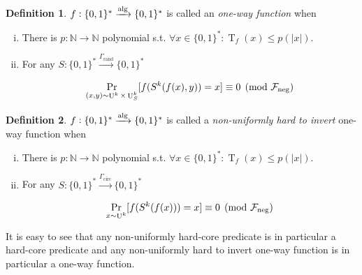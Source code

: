 \documentclass{article}
\numberwithin{equation}{section}
\theoremstyle{definition}
\newtheorem{definition}{Definition}[section]
\theoremstyle{plain}
\newcommand{\Bool}{\{0,1\}}
\newcommand{\Words}{{\Bool^*}}
\DeclareMathOperator{\Prb}{Pr}
\DeclareMathOperator{\T}{T}
\DeclareMathOperator{\Un}{U}
\newcommand{\Nats}{\mathbb{N}}
\newcommand{\Abs}[1]{\lvert #1 \rvert}
\newcommand{\Fall}{\mathcal{F}}
\newcommand{\Alg}{\xrightarrow{\textnormal{alg}}}
\begin{document}
\begin{samepage}
\begin{definition}

$f: \Words \Alg \Words$ is called an \emph{one-way function}
when

\begin{enumerate}[(i)]

\item There is $p: \Nats \rightarrow \Nats$ polynomial s.t. $\forall x \in \Words: \T_f(x) \leq p(\Abs{x})$.

\item For any $S: \Words \xrightarrow{\Gamma_{\text{rand}}} \Words$

\begin{equation}
\Prb_{(x,y) \sim \Un^k \times \Un_S^k}[f(S^k(f(x),y))=x] \equiv 0 \pmod {\Fall_{\textnormal{neg}}}
\end{equation}

\end{enumerate}

\end{definition}
\end{samepage}

\begin{samepage}
\begin{definition}

$f: \Words \Alg \Words$ is called a \emph{non-uniformly hard to invert} one-way function
when

\begin{enumerate}[(i)]

\item There is $p: \Nats \rightarrow \Nats$ polynomial s.t. $\forall x \in \Words: \T_f(x) \leq p(\Abs{x})$.

\item For any $S: \Words \xrightarrow{\Gamma_{\text{circ}}} \Words$

\begin{equation}
\Prb_{x \sim \Un^k}[f(S^k(f(x)))=x] \equiv 0 \pmod {\Fall_{\textnormal{neg}}}
\end{equation}

\end{enumerate}

\end{definition}
\end{samepage}

It is easy to see that any non-uniformly hard-core predicate is in particular a hard-core predicate and any non-uniformly hard to invert one-way function is in particular a one-way function.
\end{document}
